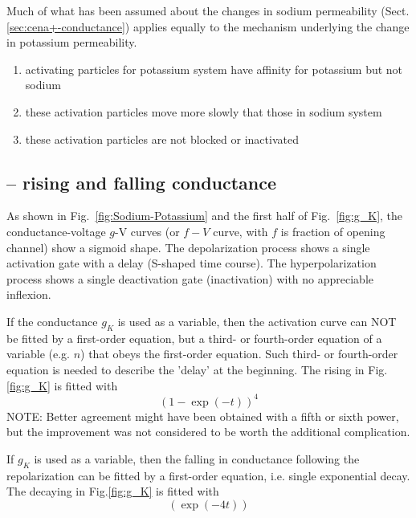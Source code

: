 Much of what has been assumed about the changes in sodium permeability
(Sect.\ref{sec:cena+-conductance}) applies equally to the mechanism underlying
the change in potassium permeability.
\begin{enumerate}
  \item activating particles for potassium system have affinity for potassium
  but not sodium
  
  \item these activation particles move more slowly that those in sodium system
  
  \item these activation particles are not blocked or inactivated
\end{enumerate}

\subsection{-- rising and falling conductance}
\label{sec:HH-K+-rising-falling}

As shown in Fig.~\ref{fig:Sodium-Potassium} and the first half of
Fig.~\ref{fig:g_K}, the conductance-voltage $g$-V curves (or $f-V$ curve, with
$f$ is fraction of opening channel) show a sigmoid shape. The depolarization
process shows a single activation gate with a delay (S-shaped time course).  The
hyperpolarization process shows a single deactivation gate (inactivation) with
no appreciable inflexion.


If the conductance $g_K$ is used as a variable, then the activation curve can
NOT be fitted by a first-order equation, but a third- or fourth-order equation
of a variable (e.g. $n$) that obeys the first-order equation. Such third- or
fourth-order equation is needed to describe the 'delay' at the beginning. The
rising in Fig.\ref{fig:g_K} is fitted with
\begin{equation}
\left( 1 - \exp(-t) \right)^4
\end{equation}
NOTE: Better agreement might have
been obtained with a fifth or sixth power, but the improvement was not considered
to be worth the additional complication.

If $g_K$ is used as a variable, then the falling in conductance following
the repolarization can be fitted by a first-order equation, i.e. single
exponential decay. The decaying in Fig.\ref{fig:g_K} is fitted with
\begin{equation}
\left( \exp(- 4 t) \right)
\end{equation}



